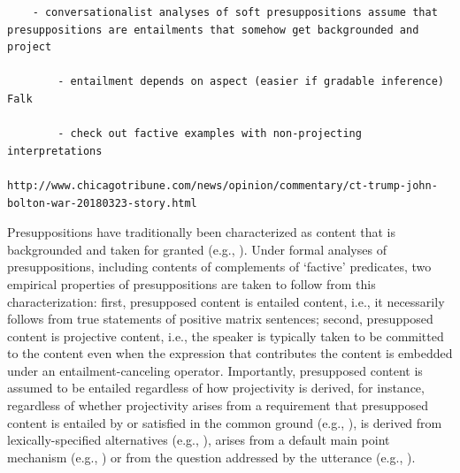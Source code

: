 \documentclass[11pt,fleqn]{article}
\newcommand{\6}{\mbox{$[\hspace*{-.6mm}[$}}
\newcommand{\9}{\mbox{$]\hspace*{-.6mm}]$}}
\begin{document}
{\begin{verbatim}
	- conversationalist analyses of soft presuppositions assume that presuppositions are entailments that somehow get backgrounded and project 

		- entailment depends on aspect (easier if gradable inference) Falk
		
		- check out factive examples with non-projecting interpretations
		
http://www.chicagotribune.com/news/opinion/commentary/ct-trump-john-bolton-war-20180323-story.html

\end{verbatim}

Presuppositions have traditionally been characterized as content that is backgrounded and taken for granted (e.g., \citealt{stalnaker74,ccmg90}). Under formal analyses of presuppositions, including contents of complements of `factive' predicates, two empirical properties of presuppositions are taken to follow from this characterization: first, presupposed content is entailed content, i.e., it necessarily follows from true statements of positive matrix sentences; second, presupposed content is projective content, i.e., the speaker is typically taken to be committed to the content even when the expression that contributes the content is embedded under an entailment-canceling operator. Importantly, presupposed content is assumed to be entailed regardless of how projectivity is derived, for instance, regardless of whether projectivity arises from a requirement that presupposed content is entailed by or satisfied in the common ground (e.g., \citealt{heim83,vds92}),  is derived  from lexically-specified alternatives (e.g., \citealt{abusch10,romoli2015}), arises from a default main point mechanism (e.g., \citealt{abrusan2011,abrusan2016}) or from the question addressed by the utterance (e.g., \citealt{best-question}). 

}
\end{document}
